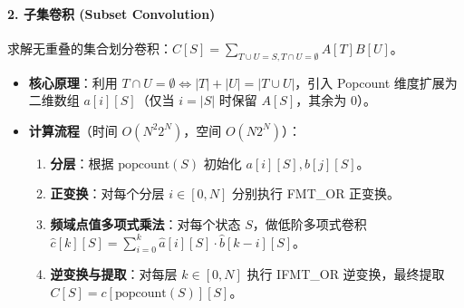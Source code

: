 \paragraph{2. 子集卷积 (Subset Convolution)}
求解无重叠的集合划分卷积：$C[S] = \sum_{T \cup U = S, T \cap U = \emptyset} A[T] B[U]$。
\begin{itemize}
    \item \textbf{核心原理}：利用 $T \cap U = \emptyset \iff |T| + |U| = |T \cup U|$，引入 Popcount 维度扩展为二维数组 $a[i][S]$（仅当 $i = |S|$ 时保留 $A[S]$，其余为 0）。
    \item \textbf{计算流程}（时间 $O(N^2 2^N)$，空间 $O(N 2^N)$）：
    \begin{enumerate}
        \item \textbf{分层}：根据 $\mathrm{popcount}(S)$ 初始化 $a[i][S], b[j][S]$。
        \item \textbf{正变换}：对每个分层 $i \in [0, N]$ 分别执行 FMT\_OR 正变换。
        \item \textbf{频域点值多项式乘法}：对每个状态 $S$，做低阶多项式卷积 $\hat{c}[k][S] = \sum_{i=0}^k \hat{a}[i][S] \cdot \hat{b}[k-i][S]$。
        \item \textbf{逆变换与提取}：对每层 $k \in [0, N]$ 执行 IFMT\_OR 逆变换，最终提取 $C[S] = c[\mathrm{popcount}(S)][S]$。
    \end{enumerate}
\end{itemize}